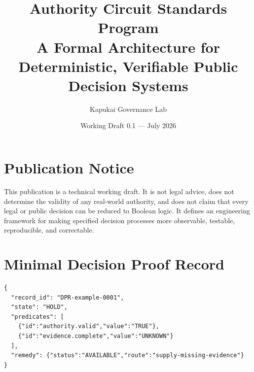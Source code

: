 \documentclass[11pt,oneside]{book}
\title{\Huge Authority Circuit Standards Program\\[8pt]\Large A Formal Architecture for Deterministic, Verifiable Public Decision Systems}
\author{Kapukai Governance Lab}
\date{Working Draft 0.1 --- July 2026}
\begin{document}
\frontmatter
\maketitle
\chapter*{Publication Notice}
This publication is a technical working draft. It is not legal advice, does not determine the validity of any real-world authority, and does not claim that every legal or public decision can be reduced to Boolean logic. It defines an engineering framework for making specified decision processes more observable, testable, reproducible, and correctable.
\tableofcontents
\mainmatter









\appendix
\chapter{Minimal Decision Proof Record}
\begin{verbatim}
{
  "record_id": "DPR-example-0001",
  "state": "HOLD",
  "predicates": [
    {"id":"authority.valid","value":"TRUE"},
    {"id":"evidence.complete","value":"UNKNOWN"}
  ],
  "remedy": {"status":"AVAILABLE","route":"supply-missing-evidence"}
}
\end{verbatim}
\end{document}
